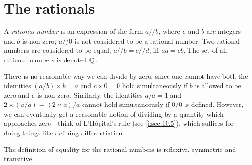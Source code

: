 \section{The rationals}\label{i:sec:4.2}

\begin{defn}\label{i:4.2.1}
  A \emph{rational number} is an expression of the form \(a // b\), where \(a\) and \(b\) are integers and \(b\) is non-zero;
  \(a // 0\) is not considered to be a rational number.
  Two rational numbers are considered to be equal, \(a // b = c // d\), iff \(ad = cb\).
  The set of all rational numbers is denoted \(\mathbb{Q}\).
\end{defn}

\begin{note}
  There is no reasonable way we can divide by zero, since one cannot have both the identities \((a / b) \times b = a\) and \(c \times 0 = 0\) hold simultaneously if \(b\) is allowed to be zero and \(a\) is non-zero.
  Similarly, the identities \(a / a = 1\) and \(2 \times (a / a) = (2 \times a) / a\) cannot hold simultaneously if \(0 / 0\) is defined.
  However, we can eventually get a reasonable notion of dividing by a quantity which approaches zero
  - think of L'H\^opital's rule (see \cref{i:sec:10.5}), which suffices for doing things like defining differentiation.
\end{note}

\begin{ac}\label{i:ac:4.2.1}
  The definition of equality for the rational numbers is reflexive, symmetric and transitive.
\end{ac}

